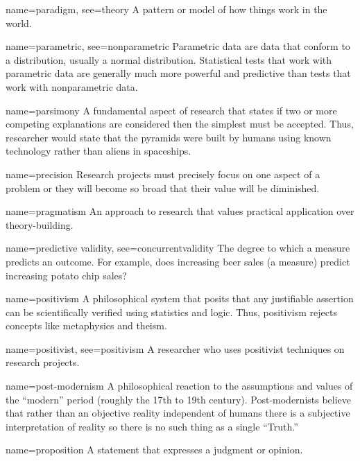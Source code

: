 {name={paradigm},
	see={theory}}
{%
	A pattern or model of how things work in the world. 
}

{name={parametric},
	see={nonparametric}}
{%
	Parametric data are data that conform to a distribution, usually a normal distribution. Statistical tests that work with parametric data are generally much more powerful and predictive than tests that work with nonparametric data.
}

	{name={parsimony}}
	{%
		A fundamental aspect of research that states if two or more competing explanations are considered then the simplest must be accepted. Thus, researcher would state that the pyramids were built by humans using known technology rather than aliens in spaceships.
	}

	{name={precision}}
	{%
		Research projects must precisely focus on one aspect of a problem or they will become so broad that their value will be diminished.
	}

{name={pragmatism}}
{%
	An approach to research that values practical application over theory-building. 
}

{name={predictive validity},
	see={concurrentvalidity}}
{%
	The degree to which a measure predicts an outcome. For example, does increasing beer sales (a measure) predict increasing potato chip sales?
}

{name={positivism}}
{%
	A philosophical system that posits that any justifiable assertion can be scientifically verified using statistics and logic. Thus, positivism rejects concepts like metaphysics and theism.
}

{name={positivist},
 see={positivism}}
{%
	A researcher who uses positivist techniques on research projects.
}

{name={post-modernism}}
{%
	A philosophical reaction to the assumptions and values of the ``modern'' period (roughly the 17th to 19th century). Post-modernists believe that rather than an objective reality independent of humans there is a subjective interpretation of reality so there is no such thing as a single ``Truth.''
}

{name={proposition}}
{%
	A statement that expresses a judgment or opinion.
}

